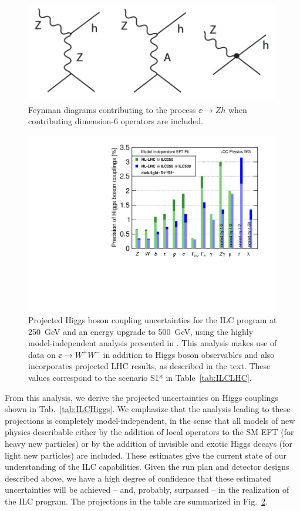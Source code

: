 \begin{figure}
\begin{center}
\includegraphics[width=0.80\hsize]{chapters/figures/Zhdiagrams.pdf}
\end{center}
\caption{Feynman diagrams contributing to the process $\ee\to Zh$ when 
contributing  dimension-6 operators are included. }
\label{fig:eeZhdiagrams}
\end{figure}

\begin{figure}
\begin{center}
\includegraphics[width=0.7\hsize]{chapters/figures/DeltaHXX_SM_ILC_MI_S12s.pdf}
\caption{Projected Higgs boson coupling uncertainties for the ILC
  program at 250~GeV and an energy upgrade to 500~GeV, using the
  highly model-independent analysis presented in \cite{Fujii:2017vwa}. This
  analysis makes use of  data on $\ee\to W^+W^-$ in addition to Higgs
  boson observables and also incorporates projected LHC results, as described
  in the text.  These
values correspond to the  scenario S1* in Table~\ref{tab:ILCLHC}.}
\label{fig:ILCmodelindep}
\end{center}
\end{figure}
%
From this analysis, we derive the projected uncertainties on Higgs
couplings shown in Tab.~\ref{tab:ILCHiggs}.  We emphasize that the
analysis leading to these projections is completely model-independent,
in the sense that all models of new physics describable either by the
addition  of local operators to the SM EFT (for heavy new particles)
or by the addition of invisible and exotic Higgs decays (for light new
particles) are included.  These estimates give the
current state of our understanding of the ILC capabilities.  Given the
run plan and  detector designs described above, we have a high degree
of confidence that these estimated uncertainties will be achieved --
and, probably, surpassed -- in the realization of the ILC program.
The projections in the table are summarized in Fig.~\ref{fig:ILCmodelindep}.

